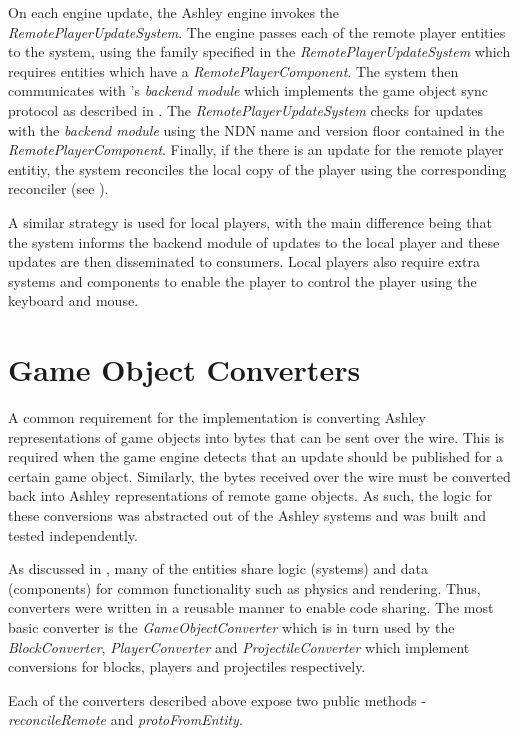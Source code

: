 On each engine update, the Ashley engine invokes the \textit{RemotePlayerUpdateSystem}. The engine passes each of the remote player entities to the system, using the family specified in the \textit{RemotePlayerUpdateSystem} which requires entities which have a \textit{RemotePlayerComponent}. The system then communicates with \game{}'s \textit{backend module} which implements the game object sync protocol as described in . The \textit{RemotePlayerUpdateSystem} checks for updates with the \textit{backend module} using the NDN name and version floor contained in the \textit{RemotePlayerComponent}. Finally, if the there is an update for the remote player entitiy, the system reconciles the local copy of the player using the corresponding reconciler (see ).

A similar strategy is used for local players, with the main difference being that the system informs the backend module of updates to the local player and these updates are then disseminated to consumers. Local players also require extra systems and components to enable the player to control the player using the keyboard and mouse.

\section{Game Object Converters}\label{sec:impl:converters}
A common requirement for the implementation is converting Ashley representations of game objects into bytes that can be sent over the wire. This is required when the game engine detects that an update should be published for a certain game object. Similarly, the bytes received over the wire must be converted back into Ashley representations of remote game objects. As such, the logic for these conversions was abstracted out of the Ashley systems and was built and tested independently.

As discussed in , many of the entities share logic (systems) and data (components) for common functionality such as physics and rendering. Thus, converters were written in a reusable manner to enable code sharing. The most basic converter is the \textit{GameObjectConverter} which is in turn used by the \textit{BlockConverter}, \textit{PlayerConverter} and \textit{ProjectileConverter} which implement conversions for blocks, players and projectiles respectively. 

Each of the converters described above expose two public methods - \textit{reconcileRemote} and \textit{protoFromEntity}.

